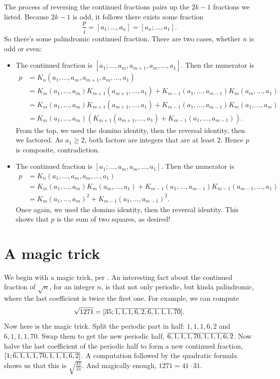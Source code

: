 \documentclass[11pt,paper=letter]{scrartcl}
\begin{document}
The process of reversing the continued fractions pairs up the $2k - 1$ fractions we listed. Because $2k - 1$ is odd, it follows there exists some fraction \[
  \frac{p}{i} = [a_1; \ldots, a_n] = [a_n; \ldots, a_1].
\]
So there's some palindromic continued fraction. There are two cases, whether $n$ is odd or even:
\begin{itemize}
\item The continued fraction is $[a_1; \ldots, a_m, a_{m+1}, a_m, \ldots, a_1]$. Then the numerator is
\begin{align*}
p &= K_n(a_1, \ldots, a_m, a_{m+1}, a_m, \ldots, a_1) \\
&= K_m(a_1, \ldots, a_m)K_{m+1}(a_{m+1}, \ldots, a_1)
+ K_{m-1}(a_1, \ldots, a_{m-1})K_{m}(a_m, \ldots, a_1) \\
&= K_m(a_1, \ldots, a_m)K_{m+1}(a_{m+1}, \ldots, a_1)
+ K_{m-1}(a_1, \ldots, a_{m-1})K_{m}(a_1, \ldots, a_m) \\
&= K_m(a_1, \ldots, a_m) \left(
K_{m+1}(a_{m+1}, \ldots, a_1)
+ K_{m-1}(a_1, \ldots, a_{m-1})
\right).
\end{align*}
From the top, we used the domino identity, then the reversal identity, then we factored. As $a_1 \ge 2$, both factors are integers that are at least $2$. Hence $p$ is composite, contradiction.

\item The continued fraction is $[a_1; \ldots, a_m, a_m, \ldots, a_1]$. Then the numerator is
\begin{align*}
p &= K_n(a_1, \ldots, a_m, a_m, \ldots, a_1) \\
&= K_m(a_1, \ldots, a_m)K_m(a_m, \ldots, a_1)
+ K_{m-1}(a_1, \ldots, a_{m-1})K_{m-1}(a_{m-1}, \ldots, a_1) \\
&= K_m(a_1, \ldots, a_m)^2 + K_{m-1}(a_1, \ldots, a_{m-1})^2.
\end{align*}
Once again, we used the domino identity, then the reversal identity. This shows that $p$ is the sum of two squares, as desired!
\end{itemize}

\section{A magic trick}

We begin with a magic trick, per \cite{bah}. An interesting fact about the continued fraction of $\sqrt{n}$, for an integer $n$, is that not only periodic, but kinda palindromic, where the last coefficient is twice the first one. For example, we can compute \[
  \sqrt{1271} = [35; \overline{1, 1, 1, 6, 2, 6, 1, 1, 1, 70}].
\]
Now here is the magic trick. Split the periodic part in half: $1, 1, 1, 6, 2$ and $6, 1, 1, 1, 70$. Swap them to get the new periodic half, $\overline{6, 1, 1, 1, 70, 1, 1, 1, 6, 2}$. Now halve the last coefficient of the periodic half to form a new continued fraction, $[1; \overline{6, 1, 1, 1, 70, 1, 1, 1, 6, 2}]$. A computation followed by the quadratic formula shows us that this is $\sqrt{\frac{41}{31}}$. And magically enough, $1271 = 41 \cdot 31$.
\end{document}
